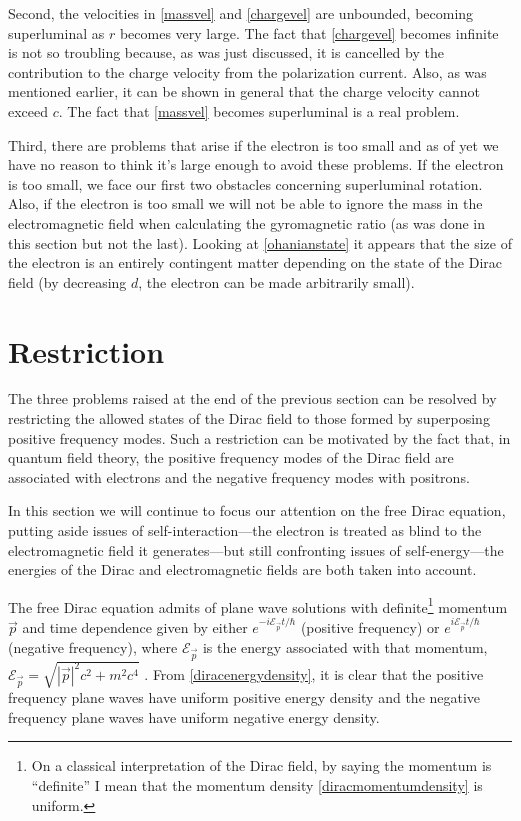 \documentclass[onecolumn,secnumarabic,amsmath,amssymb,balancelastpage,nofootinbib]{article}
\begin{document}
Second, the velocities in \eqref{massvel} and \eqref{chargevel} are unbounded, becoming superluminal as $r$ becomes very large.  The fact that \eqref{chargevel} becomes infinite is not so troubling because, as was just discussed, it is cancelled by the contribution to the charge velocity from the polarization current.  Also, as was mentioned earlier, it can be shown in general that the charge velocity cannot exceed $c$.  The fact that \eqref{massvel} becomes superluminal is a real problem.

Third, there are problems that arise if the electron is too small and as of yet we have no reason to think it's large enough to avoid these problems.  If the electron is too small, we face our first two obstacles concerning superluminal rotation.  Also, if the electron is too small we will not be able to ignore the mass in the electromagnetic field when calculating the gyromagnetic ratio (as was done in this section but not the last).  Looking at \eqref{ohanianstate} it appears that the size of the electron is an entirely contingent matter depending on the state of the Dirac field (by decreasing $d$, the electron can be made arbitrarily small).



\section{Restriction}\label{restrictionsection}

The three problems raised at the end of the previous section can be resolved by restricting the allowed states of the Dirac field to those formed by superposing positive frequency modes.  Such a restriction can be motivated by the fact that, in quantum field theory, the positive frequency modes of the Dirac field are associated with electrons and the negative frequency modes with positrons.

In this section we will continue to focus our attention on the free Dirac equation, putting aside issues of self-interaction---the electron is treated as blind to the electromagnetic field it generates---but still confronting issues of self-energy---the energies of the Dirac and electromagnetic fields are both taken into account.

The free Dirac equation admits of plane wave solutions with definite\footnote{On a classical interpretation of the Dirac field, by saying the momentum is ``definite'' I mean that the momentum density \eqref{diracmomentumdensity} is uniform.} momentum $\vec{p}$ and time dependence given by either $e^{-i \mathcal{E}_{\vec{p}} t /\hbar}$ (positive frequency) or $e^{i \mathcal{E}_{\vec{p}} t/\hbar}$ (negative frequency), where $\mathcal{E}_{\vec{p}}$ is the energy associated with that momentum, $\mathcal{E}_{\vec{p}}=\sqrt{|\vec{p}|^2 c^2 + m^2 c^4}$ \citep[chapter 3]{bjorkendrell}.  From \eqref{diracenergydensity}, it is clear that the positive frequency plane waves have uniform positive energy density and the negative frequency plane waves have uniform negative energy density.
\end{document}
